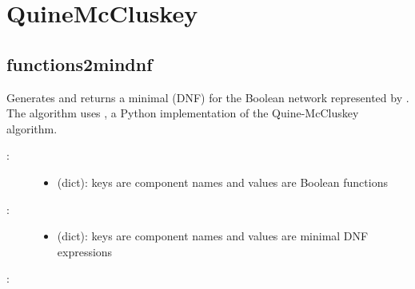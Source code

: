 \documentclass[letterpaper,10pt,english]{sphinxmanual}
\begin{document}
\section{QuineMcCluskey}
\label{\detokenize{QuineMcCluskey:quinemccluskey}}\label{\detokenize{QuineMcCluskey:networkx-has-path}}\label{\detokenize{QuineMcCluskey::doc}}\label{\detokenize{QuineMcCluskey:id1}}

\subsection{functions2mindnf}
\label{\detokenize{QuineMcCluskey:id2}}\label{\detokenize{QuineMcCluskey:functions2mindnf}}

\begin{fulllineitems}
\label{\detokenize{QuineMcCluskey:PyBoolNet.QuineMcCluskey.functions2mindnf}}
Generates and returns a minimal  (DNF) for the Boolean network represented by .
The algorithm uses {\hyperref[\detokenize{Bibliography:prekas2012}]{}}, a Python implementation of the Quine-McCluskey algorithm.
\begin{description}
\item[{:}] \leavevmode\begin{itemize}
\item {} 
 (dict): keys are component names and values are Boolean functions

\end{itemize}

\item[{:}] \leavevmode\begin{itemize}
\item {} 
 (dict): keys are component names and values are minimal DNF expressions

\end{itemize}

\end{description}

:


\end{fulllineitems}
\end{document}
